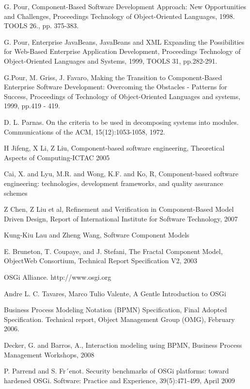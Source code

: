 \begin{thebibliography}{99}

 G. Pour, Component-Based Software Development Approach: New Opportunities and Challenges, Proceedings Technology of Object-Oriented Languages, 1998. TOOLS 26., pp. 375-383.

  G. Pour,  Enterprise JavaBeans,  JavaBeans and XML Expanding the Possibilities for Web-Based Enterprise Application Development,  Proceedings Technology of Object-Oriented Languages and Systems, 1999, TOOLS 31, pp.282-291.

 G.Pour, M. Griss, J. Favaro, Making the Transition to Component-Based Enterprise Software Development: Overcoming the Obstacles - Patterns for Success, Proceedings of Technology of Object-Oriented Languages and systems, 1999, pp.419 - 419.

 D. L. Parnas. On the criteria to be used in decomposing systems into modules. Communications of the ACM, 15(12):1053-1058, 1972.

 H Jifeng, X Li, Z Liu, Component-based software engineering, Theoretical Aspects of Computing-ICTAC 2005

 Cai, X. and Lyu, M.R. and Wong, K.F. and Ko, R, Component-based software engineering: technologies, development frameworks, and quality assurance schemes

 Z Chen, Z Liu et al, Refinement and Verification in Component-Based Model Driven Design, Report of International Institute for Software Technology, 2007

 Kung-Kiu Lau and Zheng Wang, Software Component Models

 E. Bruneton, T. Coupaye, and J. Stefani, The Fractal Component Model, ObjectWeb Consortium, Technical Report Specification V2, 2003

 OSGi Alliance. http://www.osgi.org 

 Andre L. C. Tavares, Marco Tulio Valente, A Gentle Introduction to OSGi

 Business Process Modeling Notation (BPMN) Specification, Final Adopted Specification. Technical report, Object Management Group (OMG), February 2006.

 Decker, G. and Barros, A., Interaction modeling using BPMN, Business Process Management Workshops, 2008

 P. Parrend and S. Fr´enot. Security benchmarks of OSGi platforms: toward hardened OSGi. Software: Practice and Experience, 39(5):471-499, April 2009


\end{thebibliography}
